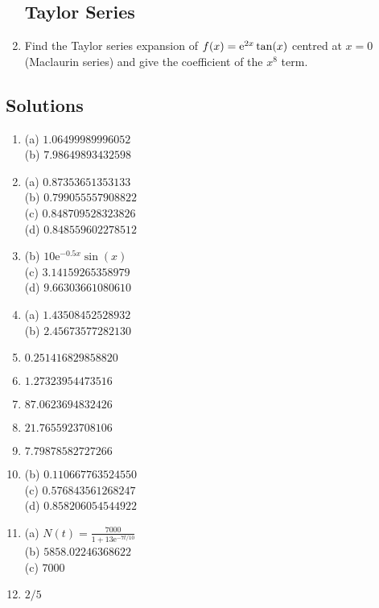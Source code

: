\begin{enumerate}
\subsection{Taylor Series}

\item Find the Taylor series expansion of $f(x) = {\rm e}^{2x} \tan(x)$ centred at $x=0$ (Maclaurin series) and give the coefficient of the $x^8$ term.

\end{enumerate}

\clearpage

\subsection{Solutions}

\begin{enumerate}
    \item (a) $1.06499989996052$ \\(b) $7.98649893432598$
    \item (a) $0.87353651353133$ \\(b) $0.799055557908822$ \\(c) $0.848709528323826$ \\(d) $0.848559602278512$
    \item (b) $10 {\mathrm e}^{- 0.5 x} \sin\! \left(x\right)$ \\(c) $3.14159265358979$ \\(d) $9.66303661080610$
    \item (a) $1.43508452528932$ \\(b) $2.45673577282130$
    \item $0.251416829858820$
    \item $1.27323954473516$
    \item $87.0623694832426$
    \item $21.7655923708106$
    \item $7.79878582727266$
    \item (b) $0.110667763524550$ \\(c) $0.576843561268247$ \\(d) $0.858206054544922$
    \item (a) $N\! \left(t\right)=\frac{7000}{1+13 {\mathrm e}^{-7 t/10}}$ \\(b) $5858.02246368622$ \\(c) $7000$
    \item $2/5$
\end{enumerate}